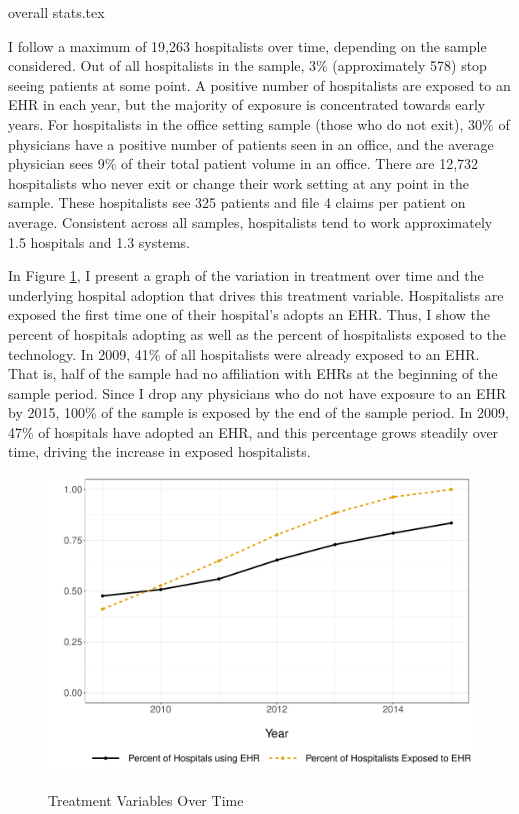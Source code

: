 \documentclass[12pt]{article}
\begin{document}
{overall stats.tex}

\normalsize
I follow a maximum of 19,263 hospitalists over time, depending on the sample considered. Out of all hospitalists in the sample, 3\% (approximately 578) stop seeing patients at some point. A positive number of hospitalists are exposed to an EHR in each year, but the majority of exposure is concentrated towards early years. For hospitalists in the office setting sample (those who do not exit), 30\% of physicians have a positive number of patients seen in an office, and the average physician sees 9\% of their total patient volume in an office. There are 12,732 hospitalists who never exit or change their work setting at any point in the sample. These hospitalists see 325 patients and file 4 claims per patient on average. Consistent across all samples, hospitalists tend to work approximately 1.5 hospitals and 1.3 systems. 


In Figure \ref{fig:treatmentgraph}, I present a graph of the variation in treatment over time and the underlying hospital adoption that drives this treatment variable. Hospitalists are exposed the first time one of their hospital's adopts an EHR. Thus, I show the percent of hospitals adopting as well as the percent of hospitalists exposed to the technology. In 2009, 41\% of all hospitalists were already exposed to an EHR. That is, half of the sample had no affiliation with EHRs at the beginning of the sample period. Since I drop any physicians who do not have exposure to an EHR by 2015, 100\% of the sample is exposed by the end of the sample period. In 2009, 47\% of hospitals have adopted an EHR, and this percentage grows steadily over time, driving the increase in exposed hospitalists. 

\begin{figure}[t]
\centering
\captionsetup{width=.45\linewidth}
    \caption{Treatment Variables Over Time}
    \includegraphics[scale=.6]{Objects/sum_stats_year.pdf}
    \label{fig:treatmentgraph}
\end{figure}
\end{document}
